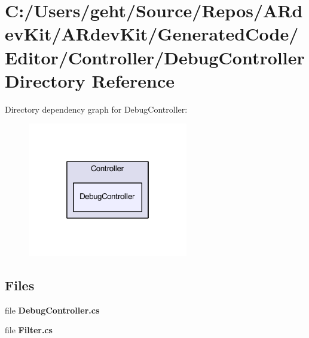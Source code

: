 \section{C\-:/\-Users/geht/\-Source/\-Repos/\-A\-Rdev\-Kit/\-A\-Rdev\-Kit/\-Generated\-Code/\-Editor/\-Controller/\-Debug\-Controller Directory Reference}
\label{dir_9b74b8c6c95188d91fbf0b9412e3106a}
Directory dependency graph for Debug\-Controller\-:
\nopagebreak
\begin{figure}[H]
\begin{center}
\leavevmode
\includegraphics[width=198pt]{dir_9b74b8c6c95188d91fbf0b9412e3106a_dep}
\end{center}
\end{figure}
\subsection*{Files}
\begin{DoxyCompactItemize}
\item 
file {\bfseries Debug\-Controller.\-cs}
\item 
file {\bfseries Filter.\-cs}
\end{DoxyCompactItemize}
